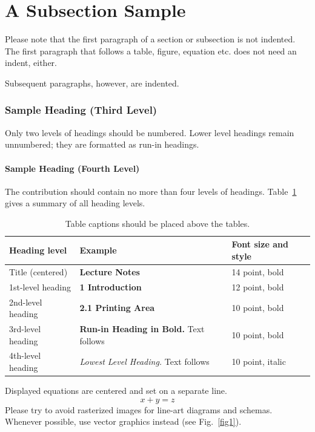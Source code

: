 \documentclass[runningheads]{llncs}
\begin{document}
\section{A Subsection Sample}
Please note that the first paragraph of a section or subsection is
not indented. The first paragraph that follows a table, figure,
equation etc. does not need an indent, either.

Subsequent paragraphs, however, are indented.

\subsubsection{Sample Heading (Third Level)} Only two levels of
headings should be numbered. Lower level headings remain unnumbered;
they are formatted as run-in headings.

\paragraph{Sample Heading (Fourth Level)}
The contribution should contain no more than four levels of
headings. Table~\ref{tab1} gives a summary of all heading levels.

\begin{table}
\caption{Table captions should be placed above the
tables.}\label{tab1}
\begin{tabular}{|l|l|l|}
\hline
Heading level &  Example & Font size and style\\
\hline
Title (centered) &  {\Large\bfseries Lecture Notes} & 14 point, bold\\
1st-level heading &  {\large\bfseries 1 Introduction} & 12 point, bold\\
2nd-level heading & {\bfseries 2.1 Printing Area} & 10 point, bold\\
3rd-level heading & {\bfseries Run-in Heading in Bold.} Text follows & 10 point, bold\\
4th-level heading & {\itshape Lowest Level Heading.} Text follows & 10 point, italic\\
\hline
\end{tabular}
\end{table}


\noindent Displayed equations are centered and set on a separate
line.
\begin{equation}
x + y = z
\end{equation}
Please try to avoid rasterized images for line-art diagrams and
schemas. Whenever possible, use vector graphics instead (see
Fig.~\ref{fig1}).
\end{document}
